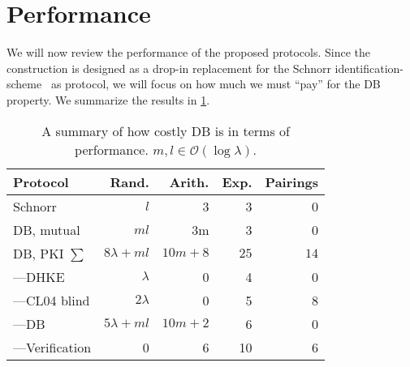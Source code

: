 \section{Performance}%
\label{performance}


We will now review the performance of the proposed protocols.
Since the construction is designed as a drop-in replacement for the Schnorr 
identification-scheme~\cite{Schnorr} as  protocol, we will focus on 
how much we must \enquote{pay} for the \ac{DB} property.
We summarize the results in \cref{performance-overview}.

\begin{frame}
  \begin{table}
    \caption{%
      A summary of how costly \acl*{DB} is in terms of performance.
      \(m, l\in \mathcal{O}(\log \lambda)\).
    }\label{performance-overview}
    \begin{tabular}{lrrrr}
      \toprule
      Protocol
      & Rand.
      & Arith.
      & Exp.
      & Pairings\\
      \midrule
      Schnorr             & \(l\)             & 3    & 3      & 0\\
      DB, mutual          & \(ml\)            & 3m   & 3      & 0\\
      DB, \acs*{PKI} \(\sum\)
                          & \(8\lambda + ml\)
                          & \(10m+8\)
                          & \(25\)
                          & \(14\)\\
      ---\acs*{DHKE}      & \(\lambda\)       & 0    & 4      & 0\\
      ---CL04 blind       & \(2\lambda\)      & 0    & 5      & 8\\
      ---DB               & \(5\lambda + ml\)    & \(10m + 2\) & 6 & 0\\
      ---Verification     & 0    & 6 & 10 & 6\\
      \bottomrule
    \end{tabular}
  \end{table}
\end{frame}

